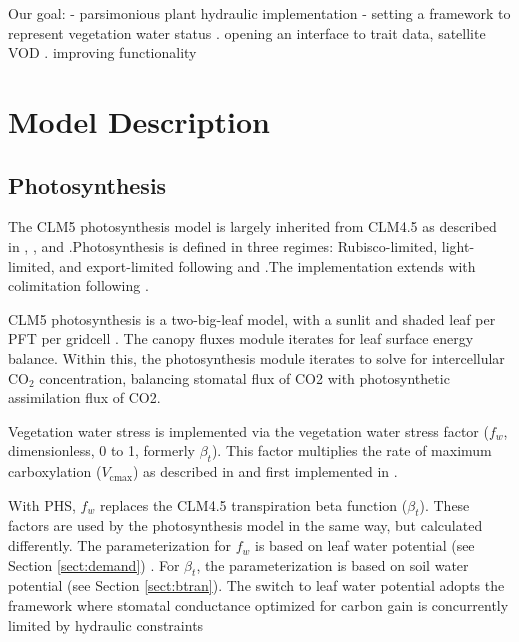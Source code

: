 \documentclass[draft,linenumbers]{agujournal}
\begin{document}
Our goal:
  - parsimonious plant hydraulic implementation
  - setting a framework to represent vegetation water status
       . opening an interface to trait data, satellite VOD \citep{momen2017}
       . improving functionality

\section{Model Description}

\subsection{Photosynthesis}
\label{sect:A}
    The CLM5 photosynthesis model is largely inherited from CLM4.5 as described in \citet{bonan2011}, \citet{thornton2007},
    and \citet{oleson2013}.Photosynthesis is defined in three regimes: Rubisco-limited, light-limited, and export-limited 
    following \citet{farquhar1980} and \citet{harley1992}.The implementation extends \citet{sellers1996a,sellers1996b} with 
    colimitation following \citet{collatz1991}. 
    
    CLM5 photosynthesis is a two-big-leaf model, with a sunlit and shaded leaf per PFT per gridcell \citep{thornton2007, 
    dai2004, oleson2013}. The canopy fluxes module iterates for leaf surface energy balance.
    Within this, the photosynthesis module iterates to solve for intercellular CO$_2$ concentration, balancing stomatal flux of 
    CO2 with photosynthetic assimilation flux of CO2.
    
    Vegetation water stress is implemented via the vegetation water stress factor ($f_w$, dimensionless, 0 to 1, formerly 
    $\beta_t$). This factor multiplies the rate of maximum carboxylation ($V_{\text{cmax}}$) as described in \citet{oleson2013} and first implemented in \citet{sellers1996a,sellers1996b}. 
    
    With PHS, $f_w$ replaces the CLM4.5 transpiration beta function ($\beta_t$). 
    These factors are used by the photosynthesis model in the same way, but calculated differently. 
    The parameterization for $f_w$ is based on leaf water potential (see Section \ref{sect:demand}) . 
    For $\beta_t$, the parameterization is based on soil water potential (see Section \ref{sect:btran}).
    The switch to leaf water potential adopts the framework where stomatal conductance optimized for carbon gain is concurrently limited by hydraulic constraints \citep{novick2016a}
\end{document}
